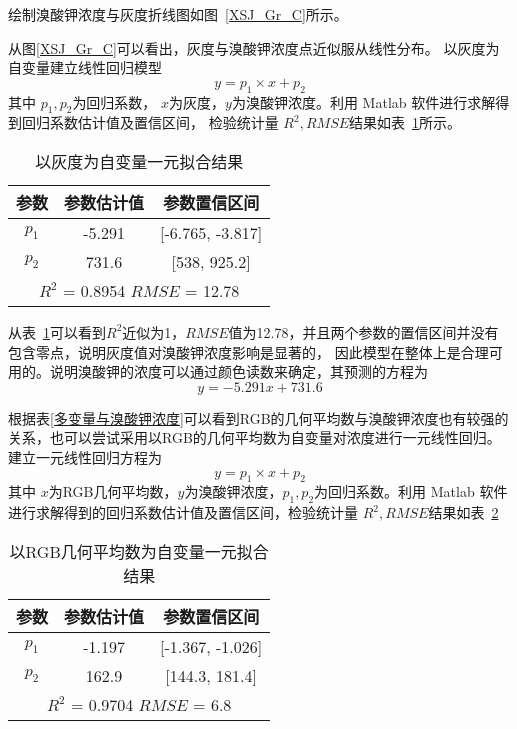     绘制溴酸钾浓度与灰度折线图如图~\ref{XSJ_Gr_C}所示。


    从图\ref{XSJ_Gr_C}可以看出，灰度与溴酸钾浓度点近似服从线性分布。 以灰度为自变量建立线性回归模型
    $$ y = p_1 \times x + p_2$$
    其中 $p_{1},p_{2}$为回归系数， $x$为灰度，$y$为溴酸钾浓度。利用 Matlab 软件进行求解得到回归系数估计值及置信区间，
    检验统计量 $R^2, RMSE $结果如表~\ref{溴酸钾一元拟合}所示。

    \begin{table}[H]
        \centering
        \caption{以灰度为自变量一元拟合结果}
        \label{溴酸钾一元拟合}
        \begin{tabular}{@{}ccc@{}}
        \toprule
        参数        & 参数估计值      & 参数置信区间                   \\ \midrule
        $p_1$     & -5.291     & {[}-6.765, -3.817{]}     \\
        $p_2$     & 731.6      & {[}538, 925.2{]}         \\
        \hline
        \multicolumn{3}{c}{$R^2$ = 0.8954 $RMSE$ = 12.78} \\ \bottomrule
        \end{tabular}
        \end{table}
    从表~\ref{溴酸钾一元拟合}可以看到$R^2$近似为1，$RMSE$值为12.78，并且两个参数的置信区间并没有包含零点，说明灰度值对溴酸钾浓度影响是显著的，
    因此模型在整体上是合理可用的。说明溴酸钾的浓度可以通过颜色读数来确定，其预测的方程为
    $$ y = -5.291 x + 731.6 $$ 

    根据表\ref{多变量与溴酸钾浓度}可以看到RGB的几何平均数与溴酸钾浓度也有较强的关系，也可以尝试采用以RGB的几何平均数为自变量对浓度进行一元线性回归。
    建立一元线性回归方程为
     $$ y = p_1 \times x + p_2$$
    其中 $x$为RGB几何平均数，$y$为溴酸钾浓度，$p_1, p_2$为回归系数。利用 Matlab 软件进行求解得到的回归系数估计值及置信区间，检验统计量 $R^2, RMSE $结果如表~\ref{RGB拟合}

    \begin{table}[H]
        \centering
        \caption{以RGB几何平均数为自变量一元拟合结果}
        \label{RGB拟合}
        \begin{tabular}{@{}ccc@{}}
        \toprule
        参数        & 参数估计值     & 参数置信区间                  \\ \midrule
        $p_1$     & -1.197    & {[}-1.367, -1.026{]}    \\
        $p_2$     & 162.9     & {[}144.3, 181.4{]}      \\
        \hline
        \multicolumn{3}{c}{$R^2$ = 0.9704 $RMSE$ = 6.8} \\ \bottomrule
        \end{tabular}
        \end{table}

